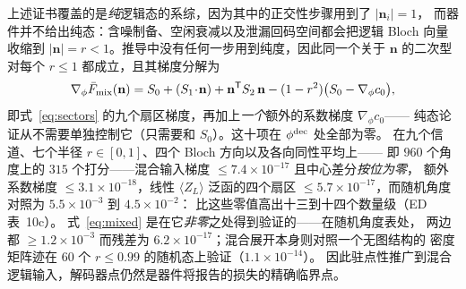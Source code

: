 \documentclass[11pt,a4paper]{article}
\begin{document}
上述证书覆盖的是\emph{纯}逻辑态的系综，因为其中的正交性步骤用到了 $|\mathbf n_i|=1$，
而器件并不给出纯态：含噪制备、空闲衰减以及泄漏回码空间都会把逻辑 Bloch 向量收缩到
$|\mathbf n|=r<1$。推导中没有任何一步用到纯度，因此同一个关于 $\mathbf n$ 的二次型对每个
$r\le1$ 都成立，且其梯度分解为
\begin{equation}
\nabla_\phi\bar F_{\rm mix}(\mathbf n)=S_0+(S_1\!\cdot\!\mathbf n)+
\mathbf n^{\mathsf T}S_2\,\mathbf n-(1-r^2)\big(S_0-\nabla_\phi c_0\big),
\label{eq:mixed}
\end{equation}
即式~\eqref{eq:sectors} 的九个扇区梯度，再加上\emph{一个}额外的系数梯度 $\nabla_\phi c_0$——
纯态论证从不需要单独控制它（只需要和 $S_0$）。这十项在 $\phi^{\rm dec}$ 处全部为零。
在九个信道、七个半径 $r\in[0,1]$、四个 Bloch 方向以及各向同性平均上——
即 $960$ 个角度上的 $315$ 个打分——混合输入梯度 $\le7.4\times10^{-17}$ 且中心差分\emph{按位为零}，
额外系数梯度 $\le3.1\times10^{-18}$，线性 $\langle Z_L\rangle$ 泛函的四个扇区
$\le5.7\times10^{-17}$，而随机角度对照为 $5.5\times10^{-3}$ 到 $4.5\times10^{-2}$：
比这些零值高出十三到十四个数量级（ED 表~10c）。
式~\eqref{eq:mixed} 是在它\emph{非零}之处得到验证的——在随机角度表处，
两边都 $\ge1.2\times10^{-3}$ 而残差为 $6.2\times10^{-17}$；混合展开本身则对照一个无图结构的
密度矩阵迹在 $60$ 个 $r\le0.99$ 的随机态上验证（$1.1\times10^{-14}$）。
因此驻点性推广到混合逻辑输入，解码器点仍然是器件将报告的损失的精确临界点。
\end{document}
